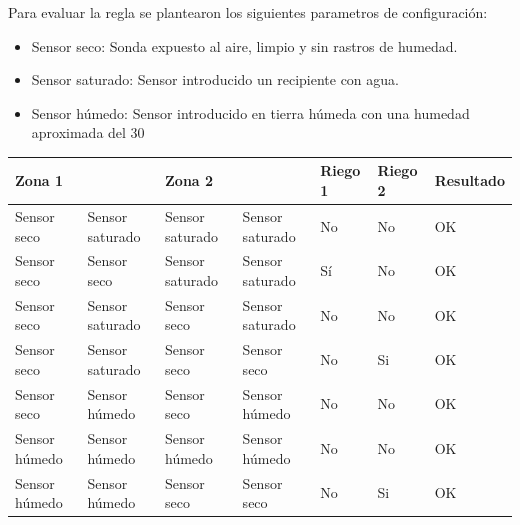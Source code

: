 Para evaluar la regla se plantearon los siguientes parametros de configuración:
\begin{itemize}
\item Sensor seco: Sonda expuesto al aire, limpio y sin rastros de humedad.
\item Sensor saturado: Sensor introducido un recipiente con agua.
\item Sensor húmedo: Sensor introducido en tierra húmeda con una humedad aproximada del 30%
\end{itemize}


\begin{table}[]
\begin{tabular}{lllllll}
\hline
\multicolumn{2}{l}{\textbf{Zona 1}} & \multicolumn{2}{l}{\textbf{Zona 2}} & \textbf{Riego 1} & \textbf{Riego 2} & \textbf{Resultado} \\ \hline
Sensor seco   & Sensor saturado & Sensor saturado & Sensor saturado & No & No & OK \\
Sensor seco   & Sensor seco     & Sensor saturado & Sensor saturado & Sí & No & OK \\
Sensor seco   & Sensor saturado & Sensor seco     & Sensor saturado & No & No & OK \\
Sensor seco   & Sensor saturado & Sensor seco     & Sensor seco     & No & Si & OK \\
Sensor seco   & Sensor húmedo   & Sensor seco     & Sensor húmedo   & No & No & OK \\
Sensor húmedo & Sensor húmedo   & Sensor húmedo   & Sensor húmedo   & No & No & OK \\
Sensor húmedo & Sensor húmedo   & Sensor seco     & Sensor seco     & No & Si & OK
\end{tabular}
\end{table}


